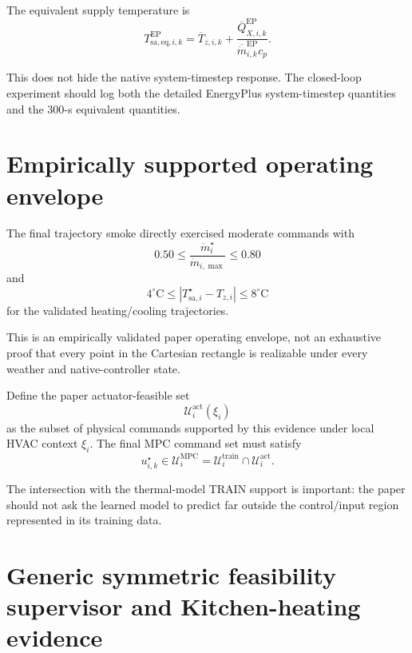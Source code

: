 \documentclass[11pt]{article}
\newcommand{\mdot}{\dot m}
\begin{document}
The equivalent supply temperature is
\begin{equation}
\boxed{
T_{\mathrm{sa,eq},i,k}^{\mathrm{EP}}
=
\overline{T}_{z,i,k}
+
\frac{
\overline{Q}_{X,i,k}^{\mathrm{EP}}
}{
\overline{\mdot}_{i,k}^{\mathrm{EP}} c_p
}.
}
\label{eq:tsa-eq}
\end{equation}

This does not hide the native system-timestep response.  The closed-loop
experiment should log both the detailed EnergyPlus system-timestep quantities
and the 300-s equivalent quantities.

\section{Empirically supported operating envelope}

The final trajectory smoke directly exercised moderate commands with
\begin{equation}
\boxed{
0.50
\le
\frac{\mdot_i^\star}{\mdot_{i,\max}}
\le
0.80
}
\label{eq:flow-envelope}
\end{equation}
and
\begin{equation}
\boxed{
4^\circ\mathrm C
\le
\left|
T_{\mathrm{sa},i}^\star - T_{z,i}
\right|
\le
8^\circ\mathrm C
}
\label{eq:thermal-envelope}
\end{equation}
for the validated heating/cooling trajectories.

This is an empirically validated paper operating envelope, not an exhaustive
proof that every point in the Cartesian rectangle is realizable under every
weather and native-controller state.

Define the paper actuator-feasible set
\begin{equation}
\mathcal U_i^{\mathrm{act}}
(\xi_i)
\end{equation}
as the subset of physical commands supported by this evidence under local HVAC
context $\xi_i$.  The final MPC command set must satisfy
\begin{equation}
\boxed{
u_{i,k}^{\star}
\in
\mathcal U_i^{\mathrm{MPC}}
=
\mathcal U_i^{\mathrm{train}}
\cap
\mathcal U_i^{\mathrm{act}}.
}
\label{eq:final-feasible-set}
\end{equation}

The intersection with the thermal-model TRAIN support is important: the paper
should not ask the learned model to predict far outside the control/input
region represented in its training data.

\section{Generic symmetric feasibility supervisor and Kitchen-heating evidence}
\end{document}
